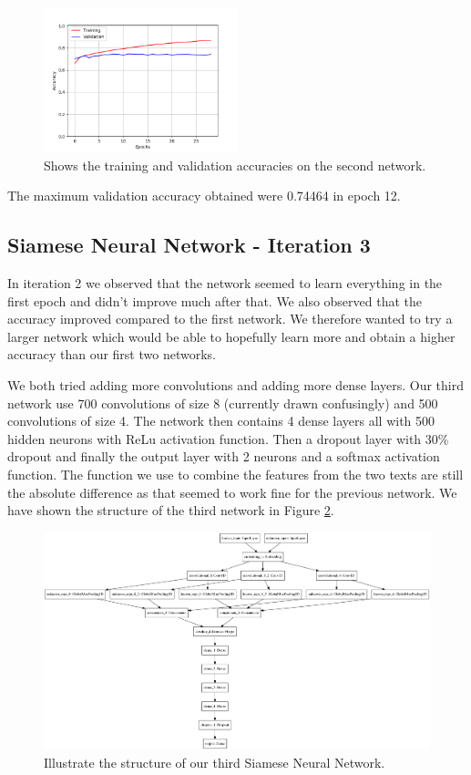 \begin{figure}
    \centering
    \includegraphics[width=0.5\textwidth]{./pictures/method/network_2_accuracies.png}
    \caption{Shows the training and validation accuracies on the second
        network.}
    \label{fig:network2_accuracies}
\end{figure}

The maximum validation accuracy obtained were 0.74464 in epoch 12.


\subsection{Siamese Neural Network - Iteration 3}

In iteration 2 we observed that the network seemed to learn everything in the
first epoch and didn't improve much after that. We also observed that the
accuracy improved compared to the first network. We therefore wanted to try a
larger network which would be able to hopefully learn more and obtain a higher
accuracy than our first two networks.

We both tried adding more convolutions and adding more dense layers. Our third
network use 700 convolutions of size 8 (currently drawn confusingly) and 500
convolutions of size 4. The network then contains 4 dense layers all with 500
hidden neurons with \gls{ReLu} activation function. Then a dropout layer with
30\% dropout and finally the output layer with 2 neurons and a softmax
activation function. The function we use to combine the features from the two
texts are still the absolute difference as that seemed to work fine for the
previous network. We have shown the structure of the third network in Figure
\ref{fig:network3}.

\begin{figure}
    \centering
    \includegraphics[width=\textwidth]{./pictures/method/network3.png}
    \caption{Illustrate the structure of our third Siamese Neural Network.}
    \label{fig:network3}
\end{figure}

